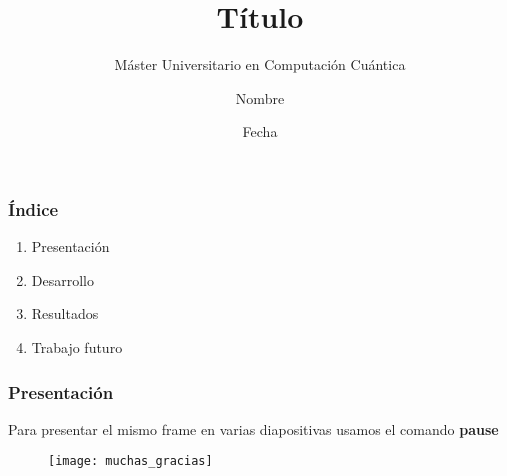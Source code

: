 \documentclass{beamer}
\title{Título}
\subtitle{Máster Universitario en Computación Cuántica}
\author{Nombre}
\date{Fecha}
\begin{document}
	\frame{\titlepage}

	\begin{frame}
		\frametitle{Índice}
		\begin{enumerate}
			\item Presentación
			\item Desarrollo
			\item Resultados
			\item Trabajo futuro
		\end{enumerate}
	\end{frame}

	\begin{frame}
		\frametitle{Presentación}
		Para presentar el mismo frame \pause en varias diapositivas usamos \pause el comando \textbf{pause}
	\end{frame}

	\begin{frame}
		\begin{figure}
			\centering
			\texttt{[image: muchas\_gracias]}
		\end{figure}
	\end{frame}
\end{document}
